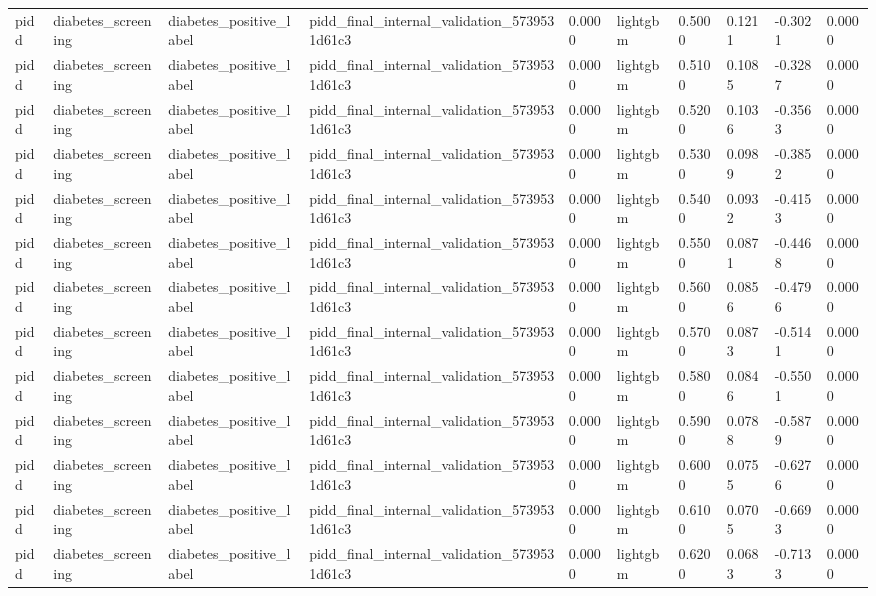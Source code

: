 \begin{tabular}{llllllllll}
pidd & diabetes\_screening & diabetes\_positive\_label & pidd\_final\_internal\_validation\_5739531d61c3 & 0.0000 & lightgbm & 0.5000 & 0.1211 & -0.3021 & 0.0000 \\
pidd & diabetes\_screening & diabetes\_positive\_label & pidd\_final\_internal\_validation\_5739531d61c3 & 0.0000 & lightgbm & 0.5100 & 0.1085 & -0.3287 & 0.0000 \\
pidd & diabetes\_screening & diabetes\_positive\_label & pidd\_final\_internal\_validation\_5739531d61c3 & 0.0000 & lightgbm & 0.5200 & 0.1036 & -0.3563 & 0.0000 \\
pidd & diabetes\_screening & diabetes\_positive\_label & pidd\_final\_internal\_validation\_5739531d61c3 & 0.0000 & lightgbm & 0.5300 & 0.0989 & -0.3852 & 0.0000 \\
pidd & diabetes\_screening & diabetes\_positive\_label & pidd\_final\_internal\_validation\_5739531d61c3 & 0.0000 & lightgbm & 0.5400 & 0.0932 & -0.4153 & 0.0000 \\
pidd & diabetes\_screening & diabetes\_positive\_label & pidd\_final\_internal\_validation\_5739531d61c3 & 0.0000 & lightgbm & 0.5500 & 0.0871 & -0.4468 & 0.0000 \\
pidd & diabetes\_screening & diabetes\_positive\_label & pidd\_final\_internal\_validation\_5739531d61c3 & 0.0000 & lightgbm & 0.5600 & 0.0856 & -0.4796 & 0.0000 \\
pidd & diabetes\_screening & diabetes\_positive\_label & pidd\_final\_internal\_validation\_5739531d61c3 & 0.0000 & lightgbm & 0.5700 & 0.0873 & -0.5141 & 0.0000 \\
pidd & diabetes\_screening & diabetes\_positive\_label & pidd\_final\_internal\_validation\_5739531d61c3 & 0.0000 & lightgbm & 0.5800 & 0.0846 & -0.5501 & 0.0000 \\
pidd & diabetes\_screening & diabetes\_positive\_label & pidd\_final\_internal\_validation\_5739531d61c3 & 0.0000 & lightgbm & 0.5900 & 0.0788 & -0.5879 & 0.0000 \\
pidd & diabetes\_screening & diabetes\_positive\_label & pidd\_final\_internal\_validation\_5739531d61c3 & 0.0000 & lightgbm & 0.6000 & 0.0755 & -0.6276 & 0.0000 \\
pidd & diabetes\_screening & diabetes\_positive\_label & pidd\_final\_internal\_validation\_5739531d61c3 & 0.0000 & lightgbm & 0.6100 & 0.0705 & -0.6693 & 0.0000 \\
pidd & diabetes\_screening & diabetes\_positive\_label & pidd\_final\_internal\_validation\_5739531d61c3 & 0.0000 & lightgbm & 0.6200 & 0.0683 & -0.7133 & 0.0000 \\

\end{tabular}
